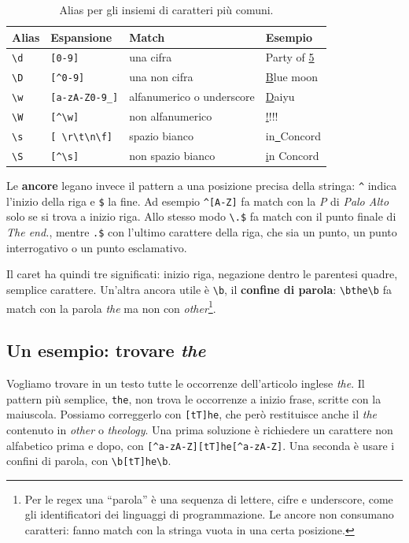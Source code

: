 \begin{table}[htbp]
\centering
\begin{tabular}{llll}
\toprule
Alias & Espansione & Match & Esempio \\
\midrule
\verb|\d| & \verb|[0-9]| & una cifra & Party of \underline{5} \\
\verb|\D| & \verb|[^0-9]| & una non cifra & \underline{B}lue moon \\
\verb|\w| & \verb|[a-zA-Z0-9_]| & alfanumerico o underscore & \underline{D}aiyu \\
\verb|\W| & \verb|[^\w]| & non alfanumerico & \underline{!}!!! \\
\verb|\s| & \verb|[ \r\t\n\f]| & spazio bianco & in\underline{\ }Concord \\
\verb|\S| & \verb|[^\s]| & non spazio bianco & \underline{i}n Concord \\
\bottomrule
\end{tabular}
\caption{Alias per gli insiemi di caratteri più comuni.}
\label{tab:regex-alias}
\end{table}

Le \textbf{ancore} legano invece il pattern a una posizione precisa della stringa: \verb|^| indica l'inizio della riga e \verb|$| la fine. Ad esempio \verb|^[A-Z]| fa match con la \textit{P} di \textit{Palo Alto} solo se si trova a inizio riga. Allo stesso modo \verb|\.$| fa match con il punto finale di \textit{The end.}, mentre \verb|.$| con l'ultimo carattere della riga, che sia un punto, un punto interrogativo o un punto esclamativo.

Il caret ha quindi tre significati: inizio riga, negazione dentro le parentesi quadre, semplice carattere. Un'altra ancora utile è \verb|\b|, il \textbf{confine di parola}: \verb|\bthe\b| fa match con la parola \textit{the} ma non con \textit{other}\footnote{Per le regex una \enquote{parola} è una sequenza di lettere, cifre e underscore, come gli identificatori dei linguaggi di programmazione. Le ancore non consumano caratteri: fanno match con la stringa vuota in una certa posizione.}.

\subsection{Un esempio: trovare \textit{the}}
Vogliamo trovare in un testo tutte le occorrenze dell'articolo inglese \textit{the}. Il pattern più semplice, \verb|the|, non trova le occorrenze a inizio frase, scritte con la maiuscola. Possiamo correggerlo con \verb|[tT]he|, che però restituisce anche il \textit{the} contenuto in \textit{other} o \textit{theology}. Una prima soluzione è richiedere un carattere non alfabetico prima e dopo, con \verb|[^a-zA-Z][tT]he[^a-zA-Z]|. Una seconda è usare i confini di parola, con \verb|\b[tT]he\b|.

